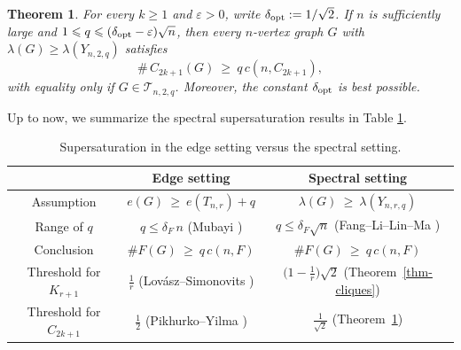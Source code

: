 \documentclass[11pt,a4paper]{article}
\newtheorem{theorem}{Theorem}[section]
\theoremstyle{definition}
\theoremstyle{plain}
\newcommand{\eps}{\varepsilon}
\renewcommand{\le}{\leqslant}
\renewcommand{\ge}{\geqslant}
\begin{document}
\begin{theorem}\label{thm-odd-cycles}
For every $k\ge 1$ and $\eps>0$, write $\delta_{\rm opt} := 1/\sqrt{2}$. If $n$ is sufficiently large and $1\le q\le (\delta_{\rm opt}-\eps)\sqrt n$, then every $n$-vertex graph  $G$ with $\lambda(G)\ge \lambda(Y_{n,2,q})$ satisfies 
$$ \texttt{\#}\, {C_{2k+1}}(G)\ \ge \ q\,c(n,C_{2k+1}),$$
 with equality only if $G\in \mathcal{T}_{n,2,q}$. Moreover, the constant $\delta_{\rm opt}$ is best possible. 
\end{theorem}



Up to now, we summarize the spectral supersaturation results in Table \ref{tab:edge-vs-spec}. 

\begin{table}[htbp]
\centering 
\renewcommand{\arraystretch}{1.3}
\begin{tabular}{@{}ccc@{}}
\toprule
  & Edge setting
  & Spectral setting \\
\midrule
Assumption 
  & $e(G)\ \ge \  e(T_{n,r})+q$
  & $\lambda(G) \  \ge \  \lambda(Y_{n,r,q})$ \\
Range of $q$
  & $q\le \delta_F\, n$
    (Mubayi \cite{Mubayi2010})
  & $q\le \delta_F \sqrt{n}$
    (Fang--Li--Lin--Ma \cite{FLLM2025}) \\
Conclusion
  & $\texttt{\#}F(G) \ \ge \  q\,c(n,F)$
  & $\texttt{\#}F(G) \ \ge  \ q\,c(n,F)$ \\
\hline
Threshold for $K_{r+1}$
  & $\tfrac{1}{r}$
    (Lov\'asz--Simonovits \cite{LS1975})
  & $\bigl(1-\tfrac{1}{r}\bigr)\sqrt{2}$
    (Theorem~\ref{thm-cliques}) \\[2pt]
    \hline 
Threshold for $C_{2k+1}$
  & $\tfrac{1}{2}$
    (Pikhurko--Yilma \cite{PY2017})
  & $\tfrac{1}{\sqrt{2}}$
    (Theorem~\ref{thm-odd-cycles}) \\
\bottomrule
\end{tabular}
\caption{Supersaturation in the edge setting versus the spectral setting.}
\label{tab:edge-vs-spec}
\end{table}
\end{document}

